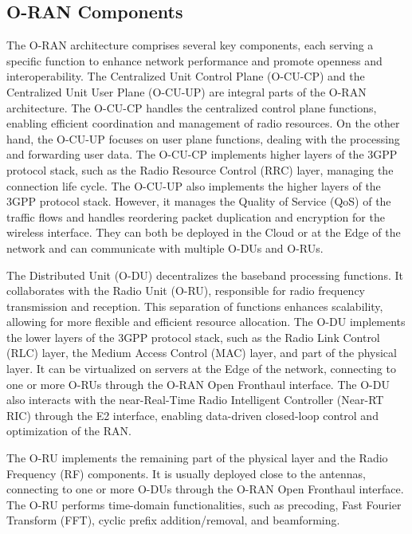 \subsection{O-RAN Components}\label{subsec:components}
The O-RAN architecture comprises several key components, each serving a specific function to enhance network performance and promote openness and interoperability.
The Centralized Unit Control Plane (O-CU-CP) and the Centralized Unit User Plane (O-CU-UP) are integral parts of the O-RAN architecture.
The O-CU-CP handles the centralized control plane functions, enabling efficient coordination and management of radio resources.
On the other hand, the O-CU-UP focuses on user plane functions, dealing with the processing and forwarding user data.
The O-CU-CP implements higher layers of the 3GPP protocol stack, such as the Radio Resource Control (RRC) layer, managing the connection life cycle.
The O-CU-UP also implements the higher layers of the 3GPP protocol stack.
However, it manages the Quality of Service (QoS) of the traffic flows and handles reordering packet duplication and encryption for the wireless interface.
They can both be deployed in the Cloud or at the Edge of the network and can communicate with multiple O-DUs and O-RUs.

The Distributed Unit (O-DU) decentralizes the baseband processing functions.
It collaborates with the Radio Unit (O-RU), responsible for radio frequency transmission and reception.
This separation of functions enhances scalability, allowing for more flexible and efficient resource allocation.
The O-DU implements the lower layers of the 3GPP protocol stack, such as the Radio Link Control (RLC) layer, the Medium Access Control (MAC) layer, and part of the physical layer.
It can be virtualized on servers at the Edge of the network, connecting to one or more O-RUs through the O-RAN Open Fronthaul interface.
The O-DU also interacts with the near-Real-Time Radio Intelligent Controller (Near-RT RIC) through the E2 interface, enabling data-driven closed-loop control and optimization of the RAN\@.

The O-RU implements the remaining part of the physical layer and the Radio Frequency (RF) components.
It is usually deployed close to the antennas, connecting to one or more O-DUs through the O-RAN Open Fronthaul interface.
The O-RU performs time-domain functionalities, such as precoding, Fast Fourier Transform (FFT), cyclic prefix addition/removal, and beamforming.

